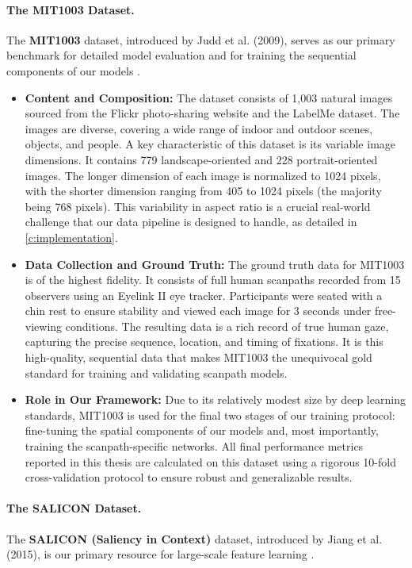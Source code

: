 \paragraph{The MIT1003 Dataset.} The \textbf{MIT1003} dataset, introduced by Judd et al. (2009), serves as our primary benchmark for detailed model evaluation and for training the sequential components of our models \cite{Judd_2009}.
\begin{itemize}
    \item \textbf{Content and Composition:} The dataset consists of 1,003 natural images sourced from the Flickr photo-sharing website and the LabelMe dataset. The images are diverse, covering a wide range of indoor and outdoor scenes, objects, and people. A key characteristic of this dataset is its variable image dimensions. It contains 779 landscape-oriented and 228 portrait-oriented images. The longer dimension of each image is normalized to 1024 pixels, with the shorter dimension ranging from 405 to 1024 pixels (the majority being 768 pixels). This variability in aspect ratio is a crucial real-world challenge that our data pipeline is designed to handle, as detailed in \cref{c:implementation}.
    \item \textbf{Data Collection and Ground Truth:} The ground truth data for MIT1003 is of the highest fidelity. It consists of full human scanpaths recorded from 15 observers using an Eyelink II eye tracker. Participants were seated with a chin rest to ensure stability and viewed each image for 3 seconds under free-viewing conditions. The resulting data is a rich record of true human gaze, capturing the precise sequence, location, and timing of fixations. It is this high-quality, sequential data that makes MIT1003 the unequivocal gold standard for training and validating scanpath models.
    \item \textbf{Role in Our Framework:} Due to its relatively modest size by deep learning standards, MIT1003 is used for the final two stages of our training protocol: fine-tuning the spatial components of our models and, most importantly, training the scanpath-specific networks. All final performance metrics reported in this thesis are calculated on this dataset using a rigorous 10-fold cross-validation protocol to ensure robust and generalizable results.
\end{itemize}

\paragraph{The SALICON Dataset.} The \textbf{SALICON (Saliency in Context)} dataset, introduced by Jiang et al. (2015), is our primary resource for large-scale feature learning \cite{jiang2015salicon}.

